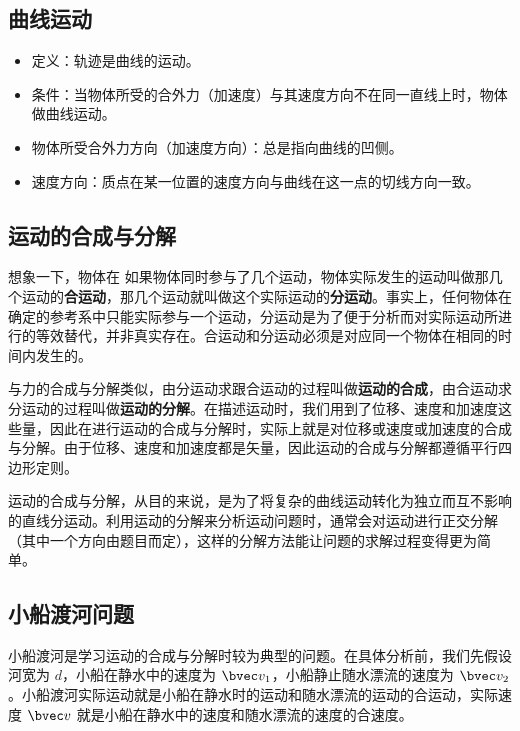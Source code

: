 

\subsection{曲线运动}

\begin{itemize}
\item 定义：轨迹是曲线的运动。
\item 条件：当物体所受的合外力（加速度）与其速度方向不在同一直线上时，物体做曲线运动。
\item 物体所受合外力方向（加速度方向）：总是指向曲线的凹侧。
\item 速度方向：质点在某一位置的速度方向与曲线在这一点的切线方向一致。
\end{itemize}

\subsection{运动的合成与分解}
想象一下，物体在
如果物体同时参与了几个运动，物体实际发生的运动叫做那几个运动的\textbf{合运动}，那几个运动就叫做这个实际运动的\textbf{分运动}。事实上，任何物体在确定的参考系中只能实际参与一个运动，分运动是为了便于分析而对实际运动所进行的等效替代，并非真实存在。合运动和分运动必须是对应同一个物体在相同的时间内发生的。

与力的合成与分解类似，由分运动求跟合运动的过程叫做\textbf{运动的合成}，由合运动求分运动的过程叫做\textbf{运动的分解}。在描述运动时，我们用到了位移、速度和加速度这些量，因此在进行运动的合成与分解时，实际上就是对位移或速度或加速度的合成与分解。由于位移、速度和加速度都是矢量，因此运动的合成与分解都遵循平行四边形定则。

运动的合成与分解，从目的来说，是为了将复杂的曲线运动转化为独立而互不影响的直线分运动。利用运动的分解来分析运动问题时，通常会对运动进行正交分解（其中一个方向由题目而定），这样的分解方法能让问题的求解过程变得更为简单。

\subsection{小船渡河问题}

小船渡河是学习运动的合成与分解时较为典型的问题。在具体分析前，我们先假设河宽为 $d$，小船在静水中的速度为 $\bvec v_1$，小船静止随水漂流的速度为 $\bvec v_2$。小船渡河实际运动就是小船在静水时的运动和随水漂流的运动的合运动，实际速度 $\bvec v$ 就是小船在静水中的速度和随水漂流的速度的合速度。

